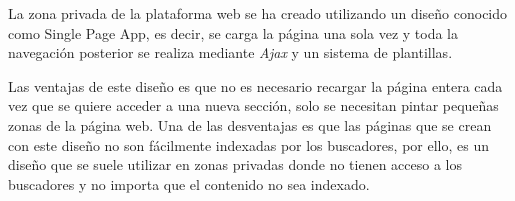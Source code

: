 La zona privada de la plataforma web se ha creado utilizando un diseño conocido como Single Page App, es decir, se carga la página una sola vez y toda la navegación posterior se realiza mediante \emph{Ajax} y un sistema de plantillas.

Las ventajas de este diseño es que no es necesario recargar la página entera cada vez que se quiere acceder a una nueva sección, solo se necesitan pintar pequeñas zonas de la página web. Una de las desventajas es que las páginas que se crean con este diseño no son fácilmente indexadas por los buscadores, por ello, es un diseño que se suele utilizar en zonas privadas donde no tienen acceso a los buscadores y no importa que el contenido no sea indexado.





